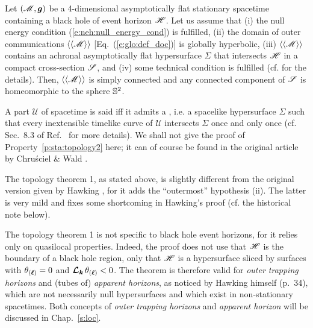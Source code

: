 \begin{prop}
\label{p:sta:topology2}
Let $(\mathscr{M}, \bm{g})$ be a 4-dimensional asymptotically flat stationary spacetime
containing a black hole of event horizon $\mathscr{H}$.
Let us assume that (i) the
null energy condition (\ref{e:neh:null_energy_cond}) is fulfilled,
(ii) the domain of outer communications $\langle\langle \mathscr{M}\rangle\rangle$
[Eq.~(\ref{e:glo:def_doc})]
is globally hyperbolic,
(iii) $\langle\langle \mathscr{M}\rangle\rangle$ contains an achronal asymptotically
flat hypersurface $\Sigma$ that intersects $\mathscr{H}$ in a compact cross-section $\mathscr{S}$,
and (iv) some technical condition is fulfilled (cf. \cite{ChrusW94b} for the details).
Then, $\langle\langle \mathscr{M}\rangle\rangle$ is simply connected and
any connected component of $\mathscr{S}$ is homeomorphic to the sphere $\mathbb{S}^2$.
\end{prop}
A part $\mathscr{U}$ of spacetime is said
\label{d:sta:glob_hyperbol}
iff it admits a \label{d:sta:Cauchy_surface}, i.e. a spacelike
hypersurface $\Sigma$ such that every inextensible timelike curve of $\mathscr{U}$
intersects $\Sigma$ once and only once (cf. Sec.~8.3 of Ref.~\cite{Wald84} for more
details). We shall not give the proof of Property~\ref{p:sta:topology2} here; it can of course
be found in the original article by Chru\'sciel \& Wald \cite{ChrusW94b}.

\begin{remark}
The topology theorem 1, as stated above, is slightly different from the original
version given by Hawking \cite{Hawki72,Hawki73,HawkiE73}, for it adds the ``outermost'' hypothesis (ii).
The latter is very mild and fixes some shortcoming in Hawking's proof
(cf. the historical note below).
\end{remark}

\begin{remark}
The topology theorem 1 is not specific to black hole event horizons, for
it relies only on quasilocal properties. Indeed, the proof does not use
that $\mathscr{H}$ is the boundary of a black hole region, only that $\mathscr{H}$ is a hypersurface
sliced by surfaces with $\theta_{(\bm{\ell})} = 0$ and $\bm{\mathcal{L}}_{\bm{k}}\, \theta_{(\bm{\ell})} < 0$.
The theorem is therefore valid for \emph{outer trapping horizons} \cite{Haywa94}
and (tubes of) \emph{apparent horizons}, as noticed by Hawking himself \cite{Hawki73} (p.~34),
which are not necessarily null hypersurfaces and which exist in non-stationary spacetimes.
Both concepts of \emph{outer trapping horizons} and \emph{apparent horizon}
will be discussed in Chap.~\ref{s:loc}.
\end{remark}

